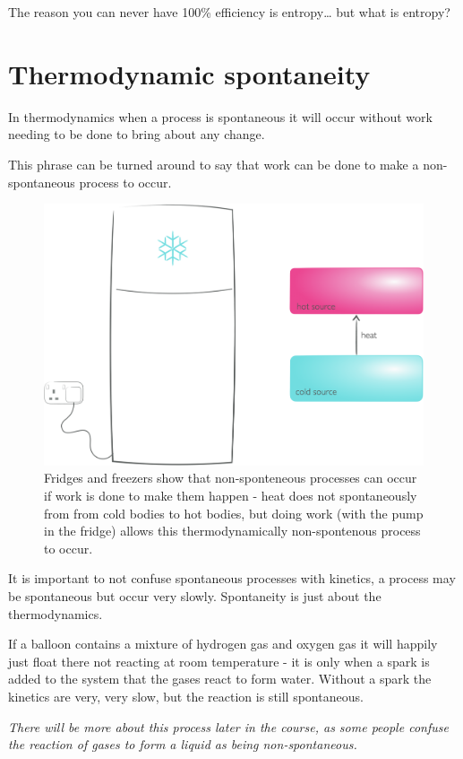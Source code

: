 \documentclass[
]{book}
\begin{document}
The reason you can never have 100\% efficiency is entropy\ldots{} but what is entropy?

\hypertarget{thermodynamic-spontaneity}{%
\section{Thermodynamic spontaneity}\label{thermodynamic-spontaneity}}

In thermodynamics when a process is spontaneous it will occur without work needing to be done to bring about any change.

This phrase can be turned around to say that work can be done to make a non-spontaneous process to occur.

\begin{figure}

{\centering \includegraphics[width=0.5\linewidth]{images/fridge} 

}

\caption{Fridges and freezers show that non-sponteneous processes can occur if work is done to make them happen - heat does not spontaneously from from cold bodies to hot bodies, but doing work (with the pump in the fridge) allows this thermodynamically non-spontenous process to occur.}\label{fig:fridge}
\end{figure}

It is important to not confuse spontaneous processes with kinetics, a process may be spontaneous but occur very slowly. Spontaneity is just about the thermodynamics.

If a balloon contains a mixture of hydrogen gas and oxygen gas it will happily just float there not reacting at room temperature - it is only when a spark is added to the system that the gases react to form water. Without a spark the kinetics are very, very slow, but the reaction is still spontaneous.

\emph{There will be more about this process later in the course, as some people confuse the reaction of gases to form a liquid as being non-spontaneous.}
\end{document}

